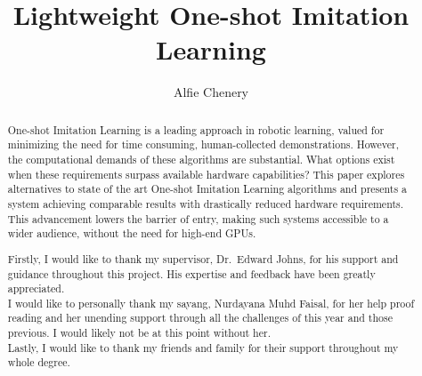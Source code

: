 \documentclass[a4paper, twoside, 12pt]{report}
\title{Lightweight One-shot Imitation Learning}
\author{Alfie Chenery}
\begin{document}


\begin{abstract}
One-shot Imitation Learning is a leading approach in robotic learning, valued for minimizing the need for time consuming, human-collected demonstrations. However, the computational demands of these algorithms are substantial. What options exist when these requirements surpass available hardware capabilities? This paper explores alternatives to state of the art One-shot Imitation Learning algorithms and presents a system achieving comparable results with drastically reduced hardware requirements. This advancement lowers the barrier of entry, making such systems accessible to a wider audience, without the need for high-end GPUs.

\end{abstract}

\renewcommand{\abstractname}{Acknowledgements}
\begin{abstract}
Firstly, I would like to thank my supervisor, Dr.~Edward Johns, for his support and guidance throughout this project. His expertise and feedback have been greatly appreciated.
\\

I would like to personally thank my sayang, Nurdayana Muhd Faisal, for her help proof reading and her unending support through all the challenges of this year and those previous. I would likely not be at this point without her.
\\

Lastly, I would like to thank my friends and family for their support throughout my whole degree. 
\end{abstract}

\tableofcontents











\end{document}
